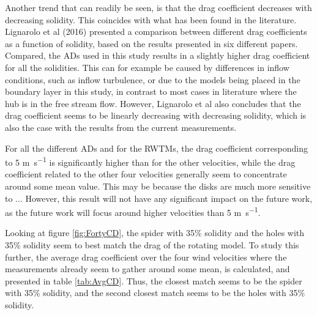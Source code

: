 
Another trend that can readily be seen, is that the drag coefficient decreases with decreasing solidity. This coincides with what has been found in the literature. Lignarolo et al (2016) \cite{Lignarolo2016} presented a comparison between different drag coefficients as a function of solidity, based on the results presented in six different papers. %
 Compared, the \gls{AD}s used in this study results in a slightly higher drag coefficient for all the solidities. This can for example be caused by differences in inflow conditions, such as inflow turbulence, or due to the models being placed in the boundary layer in this study, in contrast to most cases in literature where the hub is in the free stream flow. However, Lignarolo et al also concludes that the drag coefficient seems to be linearly decreasing with decreasing solidity, which is also the case with the results from the current measurements. 

For all the different \gls{AD}s and for the \gls{RWTM}s, the drag coefficient corresponding to 5 \si{\m\per\s} is significantly higher than for the other velocities, while the drag coefficient related to the other four velocities generally seem to concentrate around some mean value. This may be because the disks are much more sensitive to ... However, this result will not have any significant impact on the future work, as the future work will focus around higher velocities than 5 \si{\m\per\s}. 

Looking at figure \ref{fig:FortyCD}, the \gls{spider} with 35\% solidity and the \gls{holes} with 35\% solidity seem to best match the drag of the rotating model. To study this further, the average drag coefficient over the four wind velocities where the measurements already seem to gather around some mean, is calculated, and presented in table \ref{tab:AvgCD}. Thus, the closest match seems to be the \gls{spider} with 35\% solidity, and the second closest match seems to be the \gls{holes} with 35\% solidity.


